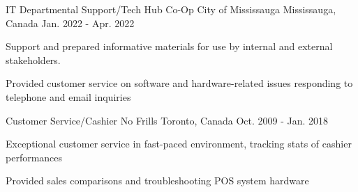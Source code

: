 \begin{cventries}
  \cventry
    {IT Departmental Support/Tech Hub Co-Op}
    {City of Mississauga}
    {Mississauga, Canada}
    {Jan. 2022 - Apr. 2022}
    {
      \begin{cvitems}
        \item {Support and prepared informative materials for use by internal and external stakeholders.}
        \item {Provided customer service on software and hardware-related issues responding to telephone and email inquiries}
      \end{cvitems}
    }
  \cventry
    {Customer Service/Cashier}
    {No Frills}
    {Toronto, Canada}
    {Oct. 2009 - Jan. 2018}
    {
      \begin{cvitems}
        \item {Exceptional customer service in fast-paced environment, tracking stats of cashier performances}
        \item {Provided sales comparisons and troubleshooting POS system hardware}
      \end{cvitems}
    }
\end{cventries}